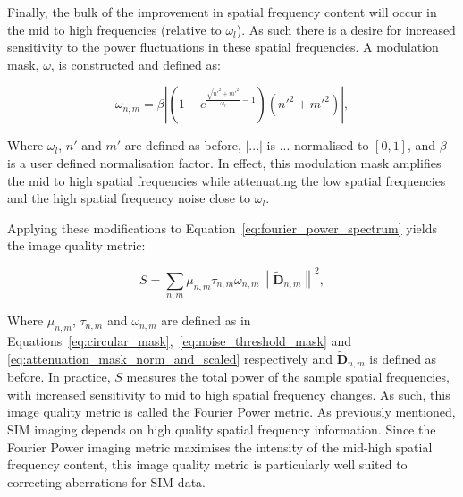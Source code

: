 Finally, the bulk of the improvement in spatial frequency content will
occur in the mid to high frequencies (relative to $\omega_{l}$). As such there is 
a desire for increased sensitivity to the power fluctuations in these 
spatial frequencies. A modulation mask, $\omega$, is constructed and 
defined as:

\begin{equation}\label{eq:attenuation_mask_norm_and_scaled}
\omega_{n,m} = \beta \left| \left(1 - e^{\frac{\sqrt{n'^{2} + m'^{2}}}{\omega_{l}}-1}\right) \left(n'^{2} + m'^{2}\right) \right|,
\end{equation}

Where $\omega_{l}$, $n'$ and $m'$ are defined as before, $\left|...\right|$ 
is $...$ normalised to $[0,1]$, and $\beta$ is a user defined 
normalisation factor. In effect, this modulation mask amplifies the mid 
to high spatial frequencies while attenuating the low spatial frequencies 
and the high spatial frequency noise close to $\omega_{l}$.

Applying these modifications to Equation~\ref{eq:fourier_power_spectrum} 
yields the image quality metric:

\begin{equation}\label{eq:Fourier_power_metric}
S = \sum\limits_{n,m}{\mu_{n,m}\tau_{n,m}\omega_{n,m}\left\| \tilde{\textbf{D}}_{n,m} \right\|^2},
\end{equation}

Where $\mu_{n,m}$, $\tau_{n,m}$ and $\omega_{n,m}$ are defined as in
Equations~\ref{eq:circular_mask},~\ref{eq:noise_threshold_mask} and
\ref{eq:attenuation_mask_norm_and_scaled} respectively and 
$\tilde{\textbf{D}}_{n,m}$ is defined as before. In practice, $S$
measures the total power of the sample spatial frequencies, with 
increased sensitivity to mid to high spatial frequency changes. As
such, this image quality metric is called the Fourier Power metric.
As previously mentioned, SIM imaging depends on high quality spatial 
frequency information\cite{debarre2008adaptive,thomas2015enhanced}. 
Since the Fourier Power imaging metric maximises the intensity of 
the mid-high spatial frequency content, this image quality metric 
is particularly well suited to correcting aberrations for SIM data.
